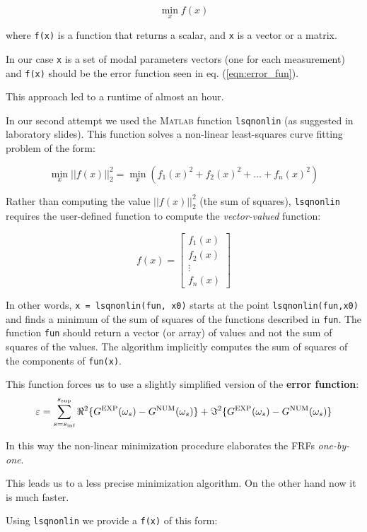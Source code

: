 \documentclass[a4paper,12pt,oneside]{article}
\begin{document}
\[
	\min_x f(x)
\]

where \lstinline!f(x)! is a function that returns a scalar, and \lstinline!x! is a vector or a matrix. 

In our case \lstinline!x! is a set of modal parameters vectors (one for each measurement) and \lstinline!f(x)! should be the error function seen in eq. (\ref{eqn:error_fun}).

This approach led to a runtime of almost an hour.

In our second attempt we used the \textsc{Matlab} function \lstinline!lsqnonlin! (as suggested in laboratory slides). This function solves a non-linear least-squares curve fitting problem of the form:

\[
	\min_x ||f(x)||_2^2 =
	\min_x \left(f_1 (x)^2 + f_2(x)^2 + \ldots + f_n (x)^2 \right) 
\]

Rather than computing the value $ ||f(x)||_2^2 $ (the sum of squares), \lstinline!lsqnonlin! requires the user-defined function to compute the \textit{vector-valued} function:

\[
	f(x) = 
		\begin{bmatrix} f_1 (x) \\ f_2 (x) \\ \vdots \\ f_n (x) \end{bmatrix}
\]

In other words, \lstinline!x = lsqnonlin(fun, x0)! starts at the point \lstinline!lsqnonlin(fun,x0)! and finds a minimum of the sum of squares of the functions described in \lstinline!fun!. The function \lstinline!fun! should return a vector (or array) of values and not the sum of squares of the values. The algorithm implicitly computes the sum of squares of the components of \lstinline!fun(x)!.

This function forces us to use a slightly simplified version of the \textbf{error function}:
\begin{equation}
\label{eqn:error_fun2} 
	\varepsilon = \sum_{s=s_\textup{inf}}^{s_\textup{sup}}
		\Re^2\{G^\textup{EXP}(\omega_s) - G^\textup{NUM}(\omega_s)\} +
		\Im^2\{G^\textup{EXP}(\omega_s) - G^\textup{NUM}(\omega_s)\}
\end{equation}

In this way the non-linear minimization procedure elaborates the FRFs \textsl{one-by-one}.

This leads us to a less precise minimization algorithm. On the other hand now it is much faster. 

Using \lstinline!lsqnonlin! we provide a \lstinline!f(x)! of this form:
\end{document}
